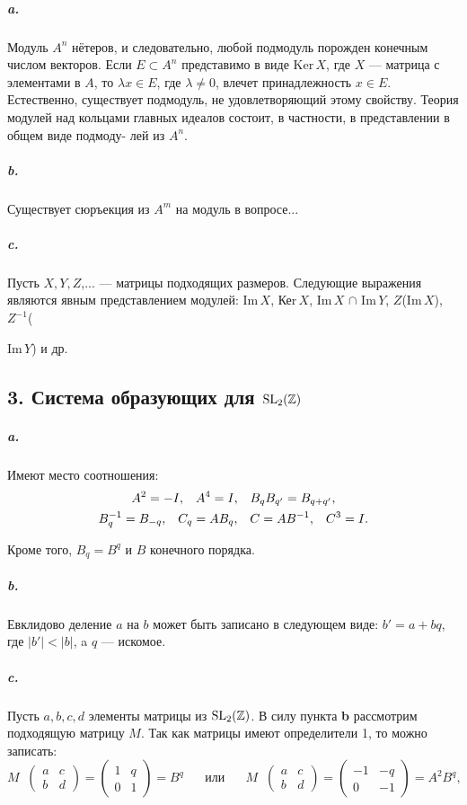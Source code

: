 \subparagraph{a.} Модуль $A^{n}$ нётеров, и следовательно, любой подмодуль порожден
конечным числом векторов. Если $E \subset A^{n}$ представимо в виде Ker\,{$X$},
где $X$ --- матрица с элементами в $A$, то $\lambda{x} \in E$, где $\lambda \neq 0$, влечет
принадлежность $x \in E$. Естественно, существует подмодуль, не удовлетворяющий этому свойству. Теория модулей над кольцами главных
идеалов состоит, в частности, в представлении в общем виде подмоду-
лей из $A^{n}$.

\subparagraph{b.} Существует сюръекция из $A^{m}$ на модуль в вопросе...

\subparagraph{c.} Пусть $X, Y, Z$,... --- матрицы подходящих размеров. Следующие выражения являются явным представлением модулей: Im\,{$X$}, Кеr\,{$X$},
Im\,{$X$} $\cap$ Im\,{$Y$}, $Z$(Im\,{$X$}), $Z^{-1}$({Im\,{$Y$}) и др.

\subsection{\normalsize{3. Система образующих для $\rm{SL_{2}}(\mathbb {Z})$}}

\subparagraph{\bf a.} Имеют место соотношения:
\begin{gather*}
A^{2} = -I,\;\;\;A^{4} = I,\;\;\;B_{q}B_{q'} = B_{q+q'}, \\
B^{-1}_{q} = B_{-q},\;\;\;C_{q} = AB_{q},\;\;\;C = AB^{-1},\;\;\;C^{3} = I.  \notag
\end{gather*}

\noindent Кроме того, $B_{q} = B^{q}$ и $B$ конечного порядка.

\subparagraph{b.} Евклидово деление $a$ на $b$ может быть записано в следующем виде:
$b' = a + bq$, где $|b'| < |b|$, a $q$ --- искомое.
\newpage


\restoretop
{}

\subparagraph{c.} Пусть $a, b, c, d$ элементы матрицы из $\rm{SL_{2}}(\mathbb {Z})$. В силу пункта {\bf b} рассмотрим подходящую матрицу $M$. Так как матрицы имеют определители 1, то можно записать:
\begin{equation*}
M\;\;{\begin{pmatrix} a & c \\ b & d \end{pmatrix}} = \begin{pmatrix} 1 & q \\ 0 & 1 \end{pmatrix} = B^{q}\;\;\;\;\;\;\text{или}\;\;\;\;\;\;M\;\;{\begin{pmatrix} a & c \\ b & d \end{pmatrix}} = \begin{pmatrix} -1 & -q \\ 0 & -1 \end{pmatrix} = A^{2}B^{q},
\end{equation*}

}
